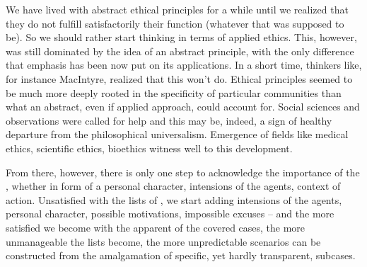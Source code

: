 {{{\pa
We have lived with abstract ethical principles for a while until we 
realized that they do not fulfill satisfactorily their function 
(whatever that was supposed to be). So we should rather start 
thinking in terms of applied ethics. This, however, was still 
dominated by the idea of an abstract principle, with the only 
difference that emphasis has been now put on its applications. In a 
short time, thinkers like, for instance MacIntyre, realized that this 
won't do. Ethical principles seemed to be much more deeply rooted in 
the specificity of particular communities than what an abstract, even if 
applied approach, could account for. Social sciences and observations 
were called for help and this may be, indeed, a sign of healthy 
departure from the philosophical universalism. Emergence of fields 
like medical ethics, scientific ethics, bioethics witness well to this 
development.

\pa From there, however, there is only one step to acknowledge the
importance of the , whether in form of a personal
character, intensions of the agents, context of action.  Unsatisfied
with the lists of , we start adding intensions of
the agents, personal character, possible motivations, impossible
excuses -- and the more satisfied we become with the apparent
 of the covered cases, the more unmanageable the
lists become, the more unpredictable scenarios can be constructed from
the amalgamation of specific, yet hardly transparent, subcases.

}}}
